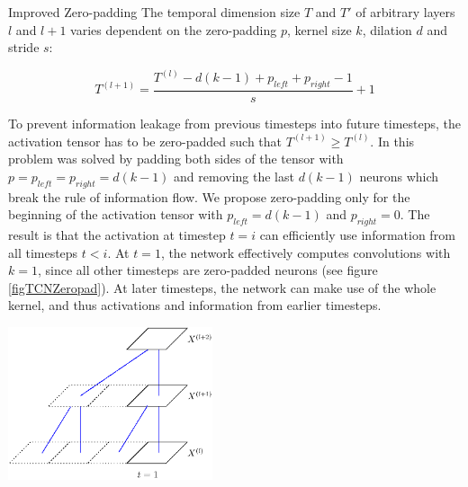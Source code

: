 \documentclass[paperwidth=24in,paperheight=48in, fontscale=0.4166666666666]{baposter}
\begin{document}
\begin{poster}
\begin{posterbox}[name=zeropad,column=0,below=method]{Improved Zero-padding}
\vspace{-2pt}
The temporal dimension size $T$ and $T'$ of arbitrary layers $l$ and $l+1$ varies dependent on the zero-padding $p$, kernel size $k$, dilation $d$ and stride $s$:

\begin{equation}
T^{(l+1)} = \frac{T^{(l)}-d(k-1)+p_{left}+p_{right}-1}{s}+1
\end{equation}

To prevent information leakage from previous timesteps into future timesteps, the activation tensor has to be zero-padded such that $T^{(l+1)} \geq T^{(l)}$. In \cite{tcn} this problem was solved by padding both sides of the tensor with $p = p_{left} = p_{right} = d(k-1)$ and removing the last $d(k-1)$ neurons which break the rule of information flow. We propose zero-padding only for the beginning of the activation tensor with $p_{left} = d(k-1)$ and $p_{right} = 0$. The result is that the activation at timestep $t=i$ can efficiently use information from all timesteps $t<i$. At $t=1$, the network effectively computes convolutions with $k=1$, since all other timesteps are zero-padded neurons (see figure \ref{figTCNZeropad}). At later timesteps, the network can make use of the whole kernel, and thus activations and information from earlier timesteps.

\begin{center}
\begin{minipage}{0.9\textwidth}
\begin{center}
  \includegraphics[width=6.0cm]{figTCNZeropad.eps}
  \label{figTCNZeropad}
\end{center}
\end{minipage}
\end{center}


\end{posterbox}
\end{poster}
\end{document}
